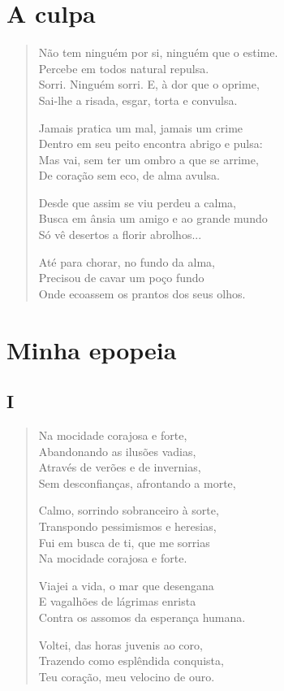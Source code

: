\chapter{A culpa}

\begin{verse}
Não tem ninguém por si, ninguém que o estime.\\
Percebe em todos natural repulsa.\\
Sorri. Ninguém sorri. E, à dor que o oprime,\\
Sai-lhe a risada, esgar, torta e convulsa.

Jamais pratica um mal, jamais um crime\\
Dentro em seu peito encontra abrigo e pulsa:\\
Mas vai, sem ter um ombro a que se arrime,\\
De coração sem eco, de alma avulsa.

Desde que assim se viu perdeu a calma,\\
Busca em ânsia um amigo e ao grande mundo\\
Só vê desertos a florir abrolhos...

Até para chorar, no fundo da alma,\\
Precisou de cavar um poço fundo\\
Onde ecoassem os prantos dos seus olhos.
\end{verse}

\chapter{Minha epopeia}

\section{I}

\begin{verse}
Na mocidade corajosa e forte,\\
Abandonando as ilusões vadias,\\
Através de verões e de invernias,\\
Sem desconfianças, afrontando a morte,

Calmo, sorrindo sobranceiro à sorte,\\
Transpondo pessimismos e heresias,\\
Fui em busca de ti, que me sorrias\\
Na mocidade corajosa e forte.

Viajei a vida, o mar que desengana\\
E vagalhões de lágrimas enrista\\
Contra os assomos da esperança humana.

Voltei, das horas juvenis ao coro,\\
Trazendo como esplêndida conquista,\\
Teu coração, meu velocino de ouro.
\end{verse}

